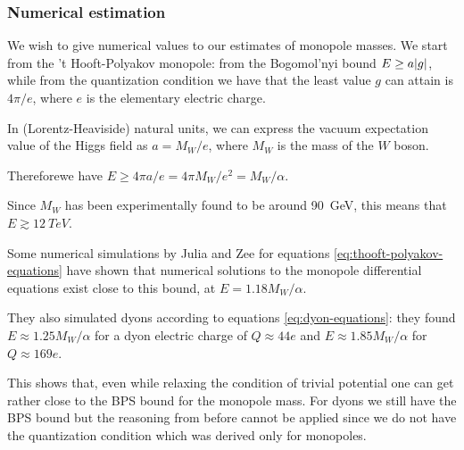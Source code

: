 \documentclass[main.tex]{subfiles}
\begin{document}

\subsubsection{Numerical estimation}

We wish to give numerical values to our estimates of monopole masses.
We start from the 't Hooft-Polyakov monopole: from the Bogomol'nyi bound \(E \geq a \abs{g} \), while from the quantization condition we have that the least value \(g\) can attain is \(4 \pi / e\), where \(e\) is the elementary electric charge. 

In (Lorentz-Heaviside) natural units, we can express the vacuum expectation value of the Higgs field as \(a = M_W / e \), where \(M_W\) is the mass of the \(W\) boson. 

Thereforewe have \(E \geq 4 \pi a / e  = 4 \pi M_W / e^2 = M_W / \alpha \). 

Since \(M_W\) has been experimentally found to be around \SI{90}{GeV}, this means that \(E \gtrsim \SI{12}{TeV}\).

Some numerical simulations by Julia and Zee \cite{Julia:Dyon} for equations \eqref{eq:thooft-polyakov-equations}  have shown that numerical solutions to the monopole differential equations exist close to this bound, at \(E = 1.18 M_W / \alpha \).

They also simulated dyons according to equations \eqref{eq:dyon-equations}: they found \(E \approx  1.25 M_W/ \alpha \) for a dyon electric charge of \(Q \approx 44 e\) and \(E \approx 1.85 M_W / \alpha \) for \(Q \approx  169 e\).

This shows that, even while relaxing the condition of trivial potential one can get rather close to the BPS bound for the monopole mass.
For dyons we still have the BPS bound but the reasoning from before cannot be applied since we do not have the quantization condition which was derived only for monopoles.
\end{document}
